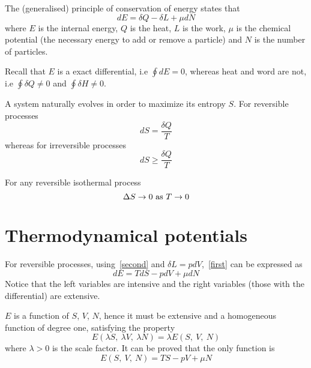     \begin{law}[1st]
        The (generalised) principle of conservation of energy states that
        \begin{equation}\label{first}
            d E = \delta Q - \delta L + \mu dN
        \end{equation}
        where $E$ is the internal energy, $Q$ is the heat, $L$ is the work, $\mu$ is the chemical potential (the necessary energy to add or remove a particle) and $N$ is the number of particles.
    \end{law}

    Recall that $E$ is a exact differential, i.e $\oint d E = 0$, whereas heat and word are not, i.e $\oint \delta Q \neq 0$ and $\oint \delta H \neq 0$.

    \begin{law}[2nd]
        A system naturally evolves in order to maximize its entropy $S$. For reversible processes
        \begin{equation}\label{second}
            dS = \frac{\delta Q}{T}
        \end{equation}
        whereas for irreversible processes
        \begin{equation*}
           dS \ge \frac{\delta Q}{T}
        \end{equation*}
    \end{law}

    \begin{law}[3rd]
        For any reversible isothermal process
        \begin{equation*}
        \Delta S \rightarrow 0 ~\textnormal{as}~ T \rightarrow 0
        \end{equation*}
    \end{law}


\section{Thermodynamical potentials}

    For reversible processes, using~\eqref{second} and $\delta L = p dV$,~\eqref{first} can be expressed as 
    \begin{equation}\label{energy}
        dE = T dS - pdV + \mu dN
    \end{equation}
    Notice that the left variables are intensive and the right variables (those with the differential) are extensive. 

    $E$ is a function of $S$, $V$, $N$, hence it must be extensive and a homogeneous function of degree one, satisfying the property
        \begin{equation*}
            E(\lambda S, ~\lambda V, ~\lambda N) = \lambda E(S, ~V, ~N)
        \end{equation*}
    where $\lambda > 0$ is the scale factor. It can be proved that the only function is 
        \begin{equation*}
            E(S, ~V, ~N) = TS - pV + \mu N
        \end{equation*}

